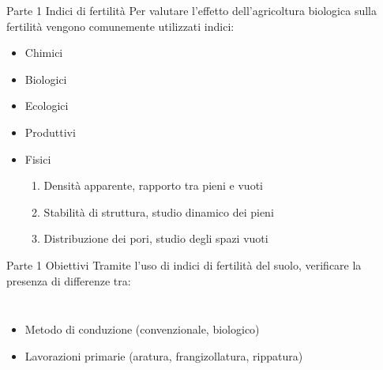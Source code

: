 \documentclass[10pt]{beamer}
\begin{document}
\begin{frame}{Parte 1 \small{Indici di fertilità}}
  Per valutare l'effetto dell'agricoltura biologica sulla fertilità
  vengono comunemente utilizzati indici:
  \begin{itemize}[<+->]
    \pause
  \item Chimici
  \item Biologici
  \item Ecologici
  \item Produttivi
  \item \LARGE Fisici

    \begin{enumerate}[<+->]

    \item  \large{Densità apparente}, \normalsize{rapporto tra pieni e vuoti}
      \vfill
    \item  \large{Stabilità di struttura}, \normalsize{studio dinamico dei pieni}
      \vfill
    \item  \large{Distribuzione dei pori}, \normalsize{studio degli spazi vuoti}
    \end{enumerate}
  \end{itemize}
\end{frame}



\begin{frame}{Parte 1 \small{Obiettivi}}
  Tramite l'uso di indici di fertilità del suolo, verificare la
  presenza di differenze tra:
  \begin{columns}[c]
    \begin{itemize}[<+->]
      \pause
    \item Metodo di conduzione (convenzionale, biologico) 

    \item Lavorazioni primarie (aratura, frangizollatura, rippatura)
    \end{itemize}
  \end{columns}
\end{frame}
\end{document}
